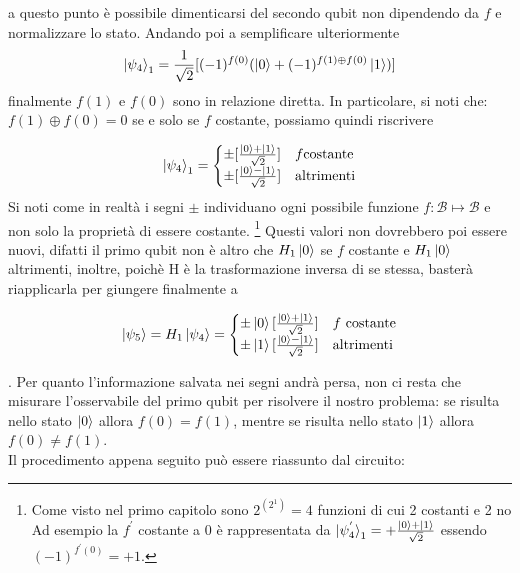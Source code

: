 \documentclass[12pt,a4paper,openright]{report}
\newcommand*\xor{\mathbin{\oplus}}
\begin{document}
\noindent a questo punto è possibile dimenticarsi del secondo qubit non dipendendo da $f$ e normalizzare lo stato. Andando poi a semplificare ulteriormente
\[
   \ket{\psi_4}_1 = \frac{1}{\sqrt2}[(-1)^{f(0)}(\ket0 + (-1)^{f(1) \xor f(0)}\ket{1} )]
\]
finalmente $f(1)$ e $ f(0)$ sono in relazione diretta. In particolare, si noti che: $f(1) \xor f(0)= 0$ se e solo se $f$ costante, possiamo quindi riscrivere

\[
    \ket{\psi_4}_1 =
    \begin{cases} 
        \pm [\frac{\ket0 + \ket1}{\sqrt2}] & f \text{costante}\\
        \pm [\frac{\ket0 - \ket1}{\sqrt2}] & \text{altrimenti}
    \end{cases}
 \]
 Si noti come in realtà i segni $\pm$ individuano ogni possibile funzione $f:\mathcal{B}\mapsto \mathcal{B}$ e non solo la proprietà di essere costante. \footnote{Come visto nel primo capitolo sono $2^{(2^1)}=4$ funzioni di cui 2 costanti e 2 no Ad esempio la  $f^{'}$ costante a 0 è rappresentata da $ \ket{\psi_4^{'}}_1 = + \frac{\ket0 + \ket1}{\sqrt2}$ essendo $(-1)^{f^{'}(0)} = +1$.}
 Questi valori non dovrebbero poi essere nuovi, difatti il primo qubit non è altro che $H_1\ket0$ se $f$ costante e $H_1\ket0$ altrimenti, inoltre, poichè H è la trasformazione inversa di se stessa, basterà riapplicarla
 per giungere finalmente a
 
 \[
    \ket{\psi_5} = H_1\ket{\psi_4} = 
    \begin{cases} 
        \pm \ket0[\frac{\ket0 + \ket1}{\sqrt2}] & f \text{ costante}\\
        \pm \ket1[\frac{\ket0 - \ket1}{\sqrt2}] & \text{altrimenti}
    \end{cases}
 \]
 
 . Per quanto l'informazione salvata nei segni andrà persa, non ci resta che misurare l'osservabile del primo qubit per risolvere il nostro problema: se risulta nello stato $\ket0$ allora $f(0)=f(1)$, mentre se risulta nello stato  $\ket1$ allora $f(0) \neq f(1)$.\\ 
 Il procedimento appena seguito può essere riassunto dal circuito:
\end{document}
